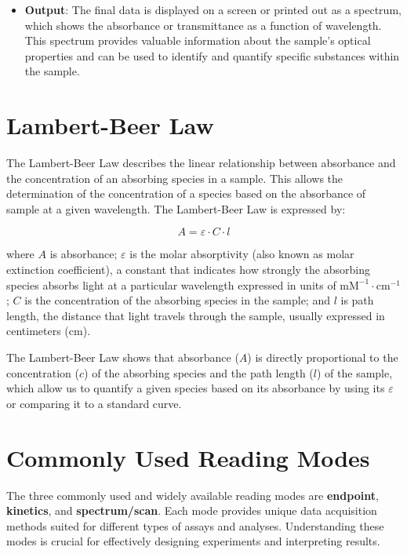 \documentclass[
  9pt,
  american,
  a5paper,
  extrafontsizes,onecolumn,openright
  ]{memoir}
\providecommand{\tightlist}{%
  \setlength{\itemsep}{0pt}\setlength{\parskip}{0pt}}
\begin{document}
\begin{itemize}
\tightlist
\item
  \textbf{Output}: The final data is displayed on a screen or printed out as a spectrum, which shows the absorbance or transmittance as a function of wavelength. This spectrum provides valuable information about the sample's optical properties and can be used to identify and quantify specific substances within the sample.
\end{itemize}

\section{Lambert-Beer Law}\label{lambert-beer-law}

The Lambert-Beer Law describes the linear relationship between absorbance and the concentration of an absorbing species in a sample. This allows the determination of the concentration of a species based on the absorbance of sample at a given wavelength. The Lambert-Beer Law is expressed by:

\[ A = \varepsilon \cdot C \cdot l \]

where \(A\) is absorbance; \(\varepsilon\) is the molar absorptivity (also known as molar extinction coefficient), a constant that indicates how strongly the absorbing species absorbs light at a particular wavelength expressed in units of \(\text{mM}^{-1} \cdot \text{cm}^{-1}\); \(C\) is the concentration of the absorbing species in the sample; and \(l\) is path length, the distance that light travels through the sample, usually expressed in centimeters (cm).

The Lambert-Beer Law shows that absorbance (\(A\)) is directly proportional to the concentration (\(c\)) of the absorbing species and the path length (\(l\)) of the sample, which allow us to quantify a given species based on its absorbance by using its \(\varepsilon\) or comparing it to a standard curve.

\section{Commonly Used Reading Modes}\label{commonly-used-reading-modes}

The three commonly used and widely available reading modes are \textbf{endpoint}, \textbf{kinetics}, and \textbf{spectrum/scan}. Each mode provides unique data acquisition methods suited for different types of assays and analyses. Understanding these modes is crucial for effectively designing experiments and interpreting results.
\end{document}
